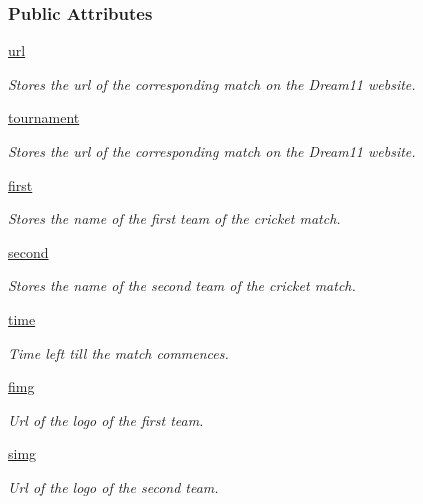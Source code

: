 \subsubsection*{Public Attributes}
\begin{DoxyCompactItemize}
\item 
\hyperlink{classproject_1_1Match_aeac700e0377708bc3d768f572544ab5e}{url}
\begin{DoxyCompactList}\small\item\em Stores the url of the corresponding match on the Dream11 website. \end{DoxyCompactList}\item 
\hyperlink{classproject_1_1Match_ac377f100bd078655a754762297731e8a}{tournament}
\begin{DoxyCompactList}\small\item\em Stores the url of the corresponding match on the Dream11 website. \end{DoxyCompactList}\item 
\hyperlink{classproject_1_1Match_ae8c662a467c74a3b376cbddf4124a84c}{first}
\begin{DoxyCompactList}\small\item\em Stores the name of the first team of the cricket match. \end{DoxyCompactList}\item 
\hyperlink{classproject_1_1Match_a4fcd044cc75f74987b145b1ea24b917c}{second}
\begin{DoxyCompactList}\small\item\em Stores the name of the second team of the cricket match. \end{DoxyCompactList}\item 
\hyperlink{classproject_1_1Match_ae51416730a405b3cad5df20a3e58cbdb}{time}
\begin{DoxyCompactList}\small\item\em Time left till the match commences. \end{DoxyCompactList}\item 
\hyperlink{classproject_1_1Match_a76c2df132c697094719f0d7450994811}{fimg}
\begin{DoxyCompactList}\small\item\em Url of the logo of the first team. \end{DoxyCompactList}\item 
\hyperlink{classproject_1_1Match_acca1adecce8205e38cc55c43b70b2867}{simg}
\begin{DoxyCompactList}\small\item\em Url of the logo of the second team. \end{DoxyCompactList}\item 

\end{DoxyCompactItemize}
